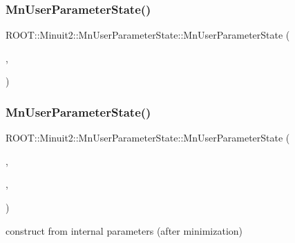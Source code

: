 \subsubsection{\texorpdfstring{MnUserParameterState()}{MnUserParameterState()}\hspace{0.1cm}{\footnotesize\ttfamily [14/16]}}
{\footnotesize\ttfamily R\+O\+O\+T\+::\+Minuit2\+::\+Mn\+User\+Parameter\+State\+::\+Mn\+User\+Parameter\+State (\begin{DoxyParamCaption}\item[{const \mbox{\hyperlink{classROOT_1_1Minuit2_1_1MnUserParameters}{Mn\+User\+Parameters}} \&}]{,  }\item[{const \mbox{\hyperlink{classROOT_1_1Minuit2_1_1MnUserCovariance}{Mn\+User\+Covariance}} \&}]{ }\end{DoxyParamCaption})}

\mbox{\label{classROOT_1_1Minuit2_1_1MnUserParameterState_a8214c3f41958849f1aaae4865bb5b129}} 
\subsubsection{\texorpdfstring{MnUserParameterState()}{MnUserParameterState()}\hspace{0.1cm}{\footnotesize\ttfamily [15/16]}}
{\footnotesize\ttfamily R\+O\+O\+T\+::\+Minuit2\+::\+Mn\+User\+Parameter\+State\+::\+Mn\+User\+Parameter\+State (\begin{DoxyParamCaption}\item[{const \mbox{\hyperlink{classROOT_1_1Minuit2_1_1MinimumState}{Minimum\+State}} \&}]{,  }\item[{double}]{,  }\item[{const \mbox{\hyperlink{classROOT_1_1Minuit2_1_1MnUserTransformation}{Mn\+User\+Transformation}} \&}]{ }\end{DoxyParamCaption})}



construct from internal parameters (after minimization) 

\mbox{\label{classROOT_1_1Minuit2_1_1MnUserParameterState_a3a5a64a086b883f61febd02676c0d151}} 
